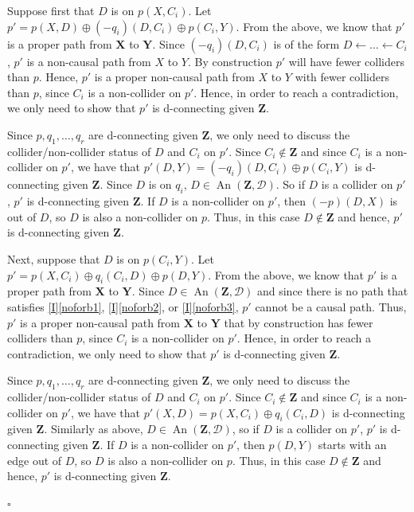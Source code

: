 \documentclass[11pt,a4paper]{article}
\newenvironment{proofof}[1][]{\begin{trivlist}
   \item[\hskip \labelsep {\bfseries Proof of #1.}]}{\hfill{}$\square$\end{trivlist}}
\DeclareMathOperator{\An}{An}
\newcommand{\g}[1][G]{\mathcal{#1}}
\begin{document}
\begin{proofof}[Theorem~\ref{theorem:completeness ac}]
\begin{enumerate}[label=(\roman*)]
{Suppose first that $D$ is on $p(X,C_i)$. Let $p' = p(X,D) \oplus (-q_i)(D,C_i) \oplus p(C_i,Y)$. From the above, we know that $p'$ is a proper path from $\mathbf{X}$ to $\mathbf{Y}$. Since $(-q_i)(D,C_i)$ is of the form $D \leftarrow \dots \leftarrow C_i$, $p'$ is a non-causal path from $X$ to $Y$. By construction $p'$ will have fewer colliders than $p$. Hence, $p'$ is a proper non-causal path from $X$ to $Y$ with fewer colliders than $p$, since $C_i$ is a non-collider on $p'$. Hence, in order to reach a contradiction, we only need to show that $p'$ is d-connecting given $\mathbf{Z}$.

Since $p,q_1,\dots,q_r$ are d-connecting given $\mathbf{Z}$, we only need to discuss the collider/non-collider status of $D$ and $C_i$ on $p'$. Since $C_i \notin \mathbf{Z}$ and since $C_i$ is a non-collider on $p'$, we have that $p'(D,Y) = (-q_i)(D,C_i) \oplus p(C_i,Y )$ is d-connecting given $\mathbf{Z}$. Since $D$ is on $q_i$, $D \in \An(\mathbf{Z},\g[D])$. So if $D$ is a collider on $p'$, $p'$ is d-connecting given $\mathbf{Z}$. If $D$ is a non-collider on $p'$, then $(-p)(D,X)$ is out of $D$, so $D$ is also a non-collider on $p$. Thus, in this case $D \notin \mathbf{Z}$ and hence, $p'$ is d-connecting given $\mathbf{Z}$.

Next, suppose that $D$ is on $p(C_i,Y)$. Let $p' = p(X,C_i) \oplus q_i(C_i,D) \oplus p(D,Y)$. From the above, we know that $p'$ is a proper path from $\mathbf{X}$ to $\mathbf{Y}$. Since $D \in \An(\mathbf{Z},\g[D])$ and since there is no path that satisfies \ref{I}\ref{noforb1}, \ref{I}\ref{noforb2}, or \ref{I}\ref{noforb3}, $p'$ cannot be a causal path. Thus, $p'$ is a proper non-causal path from $\mathbf{X}$ to $\mathbf{Y}$ that by construction has fewer colliders than $p$, since $C_i$ is a non-collider on $p'$. Hence, in order to reach a contradiction, we only need to show that $p'$ is d-connecting given $\mathbf{Z}$.

Since $p,q_1,\dots,q_r$ are d-connecting given $\mathbf{Z}$, we only need to discuss the collider/non-collider status of $D$ and $C_i$ on $p'$.
Since $C_i \notin \mathbf{Z}$ and since $C_i$ is a non-collider on $p'$, we have that $p'(X,D) = p(X,C_i) \oplus q_i(C_i,D)$ is d-connecting given $\mathbf{Z}$. Similarly as above, $D \in \An(\mathbf{Z},\g[D])$, so if $D$ is a collider on $p'$, $p'$ is d-connecting given $\mathbf{Z}$. If $D$ is a non-collider on $p'$, then $p(D,Y)$ starts with an edge out of $D$, so $D$ is also a non-collider on $p$. Thus, in this case $D \notin \mathbf{Z}$ and hence, $p'$ is d-connecting given $\mathbf{Z}$.

}
\end{enumerate}
\end{proofof}
\end{document}
